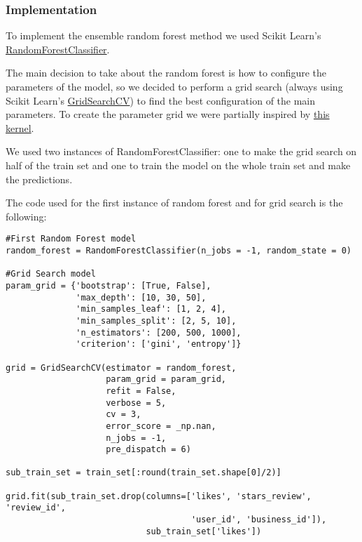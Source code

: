 \subsubsection{Implementation}

To implement the ensemble random forest method we used Scikit Learn's \href{https://scikit-learn.org/stable/modules/generated/sklearn.ensemble.RandomForestClassifier.html}{RandomForestClassifier}.

The main decision to take about the random forest is how to configure the parameters of the model, so we decided to perform a grid search (always using Scikit Learn's \href{https://scikit-learn.org/stable/modules/generated/sklearn.model_selection.GridSearchCV.html}{GridSearchCV}) to find the best configuration of the main parameters. To create the parameter grid we were partially inspired by \href{https://www.kaggle.com/sociopath00/random-forest-using-gridsearchcv}{this kernel}.

We used two instances of RandomForestClassifier: one to make the grid search on half of the train set and one to train the model on the whole train set and make the predictions.

The code used for the first instance of random forest and for grid search is the following:

\begin{lstlisting}[caption={Random Forest model},label={lst:rf-model}]
#First Random Forest model
random_forest = RandomForestClassifier(n_jobs = -1, random_state = 0)

#Grid Search model
param_grid = {'bootstrap': [True, False],
              'max_depth': [10, 30, 50],
              'min_samples_leaf': [1, 2, 4],
              'min_samples_split': [2, 5, 10],
              'n_estimators': [200, 500, 1000],
              'criterion': ['gini', 'entropy']}

grid = GridSearchCV(estimator = random_forest, 
                    param_grid = param_grid, 
                    refit = False, 
                    verbose = 5, 
                    cv = 3, 
                    error_score = _np.nan, 
                    n_jobs = -1, 
                    pre_dispatch = 6)

sub_train_set = train_set[:round(train_set.shape[0]/2)]

grid.fit(sub_train_set.drop(columns=['likes', 'stars_review', 'review_id', 
                                     'user_id', 'business_id']),
                            sub_train_set['likes'])
\end{lstlisting}

